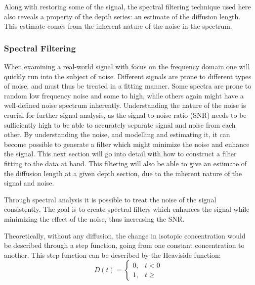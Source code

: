 \documentclass[../../CompleteThesis2/Complete_2ndDraft]{subfiles}
\begin{document}
Along with restoring some of the signal, the spectral filtering technique used here also reveals a property of the depth series: an estimate of the diffusion length. This estimate comes from the inherent nature of the noise in the spectrum.

\subsubsection[Spectral Filtering][Spectral Filtering]{Spectral Filtering}
\label{Subsubsec:SignalAnalysis_BackDiffusion_SpectralFiltering}


When examining a real-world signal with focus on the frequency domain one will quickly run into the subject of noise. Different signals are prone to different types of noise, and must thus be treated in a fitting manner. Some spectra are prone to random low frequency noise and some to high, while others again might have a well-defined noise spectrum inherently. Understanding the nature of the noise is crucial for further signal analysis, as the signal-to-noise ratio (SNR) needs to be sufficiently high to be able to accurately separate signal and noise from each other. By understanding the noise, and modelling and estimating it, it can become possible to generate a filter which might minimize the noise and enhance the signal. This next section will go into detail with how to construct a filter fitting to the data at hand. This filtering will also be able to give an estimate of the diffusion length at a given depth section, due to the inherent nature of the signal and noise.

%

Through spectral analysis it is possible to treat the noise of the signal consistently. The goal is to create spectral filters which enhances the signal while minimizing the effect of the noise, thus increasing the SNR.

Theoretically, without any diffusion, the change in isotopic concentration would be described through a step function, going from one constant concentration to another. This step function can be described by the Heaviside function:
\begin{equation}
	D(t) = \begin{cases}
		0, & t < 0 \\
		1, & t \geq
	\end{cases}
\end{equation}
\end{document}
